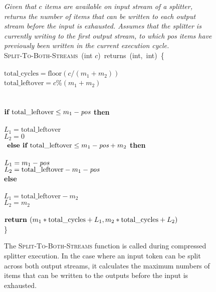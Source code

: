 \begin{figure}[t!]
\centering
\begin{minipage}{0.75\textwidth}
{\it Given that $c$ items are available on input stream of a splitter,
  returns the number of items that can be written to each output
  stream before the input is exhausted.  Assumes that the splitter is
  currently writing to the first output stream, to which pos items
  have previously been written in the current execution cycle.}\\
\textsc{Split-To-Both-Streams}~(int $c$)~returns~(int,~int)~\{\\
\\
 $\mbox{total\_cycles} = \mbox{floor}(c/(m_1 + m_2))$\\
 $\mbox{total\_leftover} = c$\%$(m_1 + m_2)$\\
~\\
\\
\tab$\mbox{\bf if~} \mbox{total\_leftover} \leq m_1 - \mbox{\it pos}$ {\bf then}\\
\tab{}\\
\tab\tab$L_1 = \mbox{total\_leftover}$\\
\tab\tab$L_2 = 0$\\
\tab$\mbox{\bf~else if~} \mbox{total\_leftover} \leq m_1-\mbox{\it pos} + m_2$ {\bf then}\\
\tab{}\\
\tab\tab$L_1 = m_1-\mbox{\it pos}$\\
\tab\tab$L_2 = \mbox{total\_leftover} - m_1-\mbox{\it pos}$\\
\tab\mbox{\bf else}\\
\tab{}\\
\tab\tab$L_1 = \mbox{total\_leftover} - m_2$\\
\tab\tab$L_2 = m_2$\\
~ \\
\tab$\mbox{\bf return~}(m_1*\mbox{total\_cycles} + L_1, m_2*\mbox{total\_cycles} + L_2)$\\
\}
\end{minipage}
\caption[\textsc{Split-To-Both-Streams} function for compressed splitter
  execution]{The \textsc{Split-To-Both-Streams} function is called during
  compressed splitter execution.  In the case where an input token can
  be split across both output streams, it calculates the maximum
  numbers of items that can be written to the outputs before the input
  is exhausted.\protect\label{fig:split-to-both-streams}}
\end{figure}

